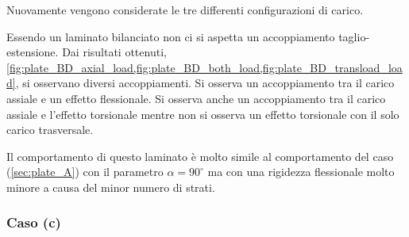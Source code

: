 \documentclass[a4paper,num-refs]{oup-contemporary}
\begin{document}
Nuovamente vengono considerate le tre differenti configurazioni di carico. 

Essendo un laminato bilanciato non ci si aspetta un accoppiamento taglio-estensione. Dai risultati ottenuti, \cref{fig:plate_BD_axial_load,fig:plate_BD_both_load,fig:plate_BD_transload_load}, si osservano diversi accoppiamenti. Si osserva un accoppiamento tra il carico assiale e un effetto flessionale. Si osserva anche un accoppiamento tra il carico assiale e l'effetto torsionale mentre non si osserva un effetto torsionale con il solo carico trasversale. 

Il comportamento di questo laminato è molto simile al comportamento del caso (\cref{sec:plate_A}) con il parametro $\alpha=90^\circ$ ma con una rigidezza flessionale molto minore a causa del minor numero di strati. 


\subsubsection{Caso (c)}
\label{sec:plate_C}
\end{document}
